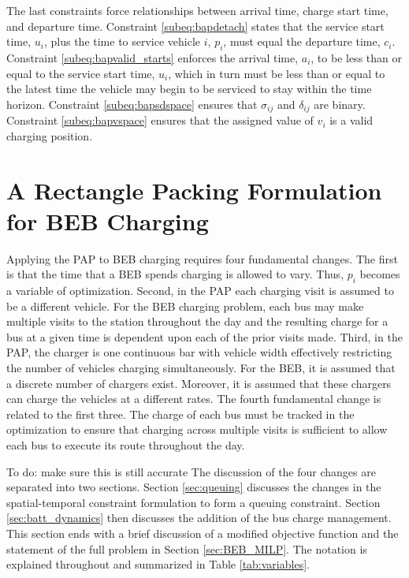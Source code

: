 \documentclass[utf8]{FrontiersinHarvard}
\newcommand{\TODO}[1]{{\color{green} To do: #1}}                                %
\begin{document}
The last constraints force relationships between arrival time, charge start time, and departure time. Constraint
\eqref{subeq:bapdetach} states that the service start time, $u_i$, plus the time to service vehicle $i$, $p_i$, must
equal the departure time, $c_i$. Constraint \eqref{subeq:bapvalid_starts} enforces the arrival time, $a_i$, to be less
than or equal to the service start time, $u_i$, which in turn must be less than or equal to the latest time the vehicle
may begin to be serviced to stay within the time horizon. Constraint \eqref{subeq:bapsdspace} ensures that $\sigma_{ij}$ and
$\delta_{ij}$ are binary. Constraint \eqref{subeq:bapvspace} ensures that the assigned value of $v_i$ is a valid charging
position.

%
\section{A Rectangle Packing Formulation for BEB Charging}  \label{sec:problemformulation}
Applying the PAP to BEB charging requires four fundamental changes. The first is that the time that a BEB spends
charging is allowed to vary. Thus, $p_i$ becomes a variable of optimization. Second, in the PAP each charging visit is
assumed to be a different vehicle. For the BEB charging problem, each bus may make multiple visits to the station
throughout the day and the resulting charge for a bus at a given time is dependent upon each of the prior visits made.
Third, in the PAP, the charger is one continuous bar with vehicle width effectively restricting the number of vehicles
charging simultaneously. For the BEB, it is assumed that a discrete number of chargers exist. Moreover, it is assumed that these chargers can
charge the vehicles at a different rates. The fourth fundamental change is related to the first three. The charge of each
bus must be tracked in the optimization to ensure that charging across multiple visits is sufficient to allow each bus
to execute its route throughout the day.

\TODO{make sure this is still accurate}
The discussion of the four changes are separated into two sections. Section \ref{sec:queuing} discusses the changes in
the spatial-temporal constraint formulation to form a queuing constraint. Section \ref{sec:batt_dynamics} then discusses
the addition of the bus charge management. This section ends with a brief discussion of a modified objective function
and the statement of the full problem in Section \ref{sec:BEB_MILP}. The notation is
explained throughout and summarized in Table \ref{tab:variables}.
\end{document}
